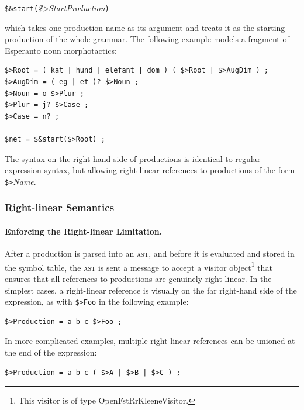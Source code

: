 \documentclass[letterpaper,12pt]{article}
\newcommand{\acro}{\textsc}
\begin{document}
\vspace{0.5cm}
\verb!$&start(!\emph{\$>StartProduction}\verb!)!
\vspace{0.5cm}

\noindent
which takes one production
name as its argument and treats it as the starting production of the whole
grammar.  The following example models a fragment of Esperanto noun morphotactics:

\begin{Verbatim}[fontsize=\small]
$>Root = ( kat | hund | elefant | dom ) ( $>Root | $>AugDim ) ;
$>AugDim = ( eg | et )? $>Noun ;
$>Noun = o $>Plur ;
$>Plur = j? $>Case ;
$>Case = n? ;

$net = $&start($>Root) ;
\end{Verbatim}

\noindent
The syntax on the right-hand-side of productions is identical to regular
expression syntax, but allowing right-linear references to productions of the form
\verb!$>!\emph{Name}.

\subsubsection{Right-linear Semantics}


\paragraph{Enforcing the Right-linear Limitation.}

After a production is parsed into an
\acro{ast}, and before it is evaluated and stored in the symbol table, the
\acro{ast} is sent a message to accept a visitor object\footnote{This
visitor is of type
OpenFstRrKleeneVisitor.} that ensures that
all references to productions are genuinely right-linear.  In the simplest cases,
a right-linear reference is visually on the far right-hand side of the
expression, as with \verb!$>Foo! in the following example:

\begin{Verbatim}[fontsize=\small]
$>Production = a b c $>Foo ;
\end{Verbatim}

\noindent
In more complicated examples, multiple right-linear references can be unioned 
at the end of the expression:

\begin{Verbatim}[fontsize=\small]
$>Production = a b c ( $>A | $>B | $>C ) ;
\end{Verbatim}
\end{document}
